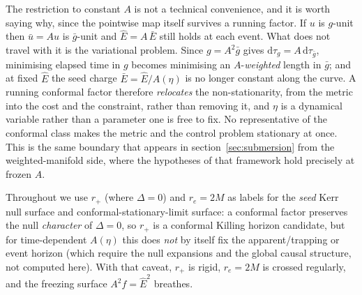\documentclass[12pt]{iopart}
\theoremstyle{plain}
\theoremstyle{definition}
\theoremstyle{remark}
\newcommand{\Ehat}{\hat E}
\newcommand{\rp}{r_{+}}
\newcommand{\re}{r_{e}}
\newcommand{\dd}{\mathrm{d}}
\begin{document}
The restriction to constant $A$ is not a technical convenience, and it is worth
saying why, since the pointwise map itself survives a running factor. If $u$ is
$g$-unit then $\bar u=Au$ is $\bar g$-unit and $\Ehat=A\,\bar E$ still holds at
each event. What does not travel with it is the variational problem. Since
$g=A^2\bar g$ gives $\dd\tau_g=A\,\dd\tau_{\bar g}$, minimising elapsed time in
$g$ becomes minimising an $A$-\emph{weighted} length in $\bar g$; and at fixed
$\Ehat$ the seed charge $\bar E=\Ehat/A(\eta)$ is no longer constant along the
curve. A running conformal factor therefore \emph{relocates} the non-stationarity,
from the metric into the cost and the constraint, rather than removing it, and
$\eta$ is a dynamical variable rather than a parameter one is free to fix. No
representative of the conformal class makes the metric and the control problem
stationary at once. This is the same boundary that appears in
section~\ref{sec:submersion} from the weighted-manifold side, where the hypotheses
of that framework hold precisely at frozen $A$.

Throughout we use $\rp$ (where $\Delta=0$) and $\re=2M$ as
labels for the \emph{seed} Kerr null surface and conformal-stationary-limit surface:
a conformal factor preserves the null \emph{character} of $\Delta=0$, so $\rp$ is a
conformal Killing horizon candidate, but for time-dependent $A(\eta)$ this does
\emph{not} by itself fix the apparent/trapping or event horizon (which require the
null expansions and the global causal structure, not computed here). With that
caveat, $\rp$ is rigid, $\re=2M$ is crossed regularly, and the freezing surface
$A^2 f=\Ehat^2$ breathes.
\end{document}
